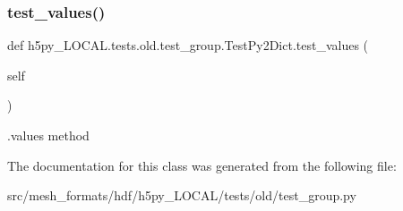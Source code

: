 \subsubsection{\texorpdfstring{test\+\_\+values()}{test\_values()}}
{\footnotesize\ttfamily def h5py\+\_\+\+L\+O\+C\+A\+L.\+tests.\+old.\+test\+\_\+group.\+Test\+Py2\+Dict.\+test\+\_\+values (\begin{DoxyParamCaption}\item[{}]{self }\end{DoxyParamCaption})}

\begin{DoxyVerb}.values method \end{DoxyVerb}
 

The documentation for this class was generated from the following file\+:\begin{DoxyCompactItemize}
\item 
src/mesh\+\_\+formats/hdf/h5py\+\_\+\+L\+O\+C\+A\+L/tests/old/test\+\_\+group.\+py\end{DoxyCompactItemize}
